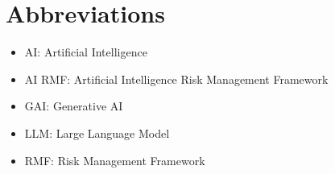 \documentclass[fleqn]{article}
\begin{document}
\section*{Abbreviations}

\begin{itemize}
	\item AI: Artificial Intelligence
	\item AI RMF: Artificial Intelligence Risk Management Framework
	\item GAI: Generative AI
	\item LLM: Large Language Model
	\item RMF: Risk Management Framework
\end{itemize}



\end{document}
